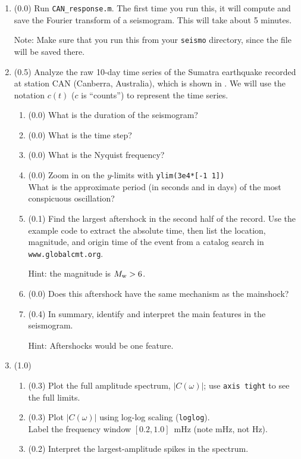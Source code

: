 \documentclass[11pt,titlepage,fleqn]{article}
\begin{document}
\begin{enumerate}

\item (0.0) Run \verb+CAN_response.m+. The first time you run this, it will compute and save the Fourier transform of a seismogram. This will take about 5 minutes.

Note: Make sure that you run this from your \verb+seismo+ directory, since the file will be saved there.


\item (0.5) Analyze the raw 10-day time series of the Sumatra earthquake recorded at station CAN (Canberra, Australia), which is shown in . We will use the notation $c(t)$ ($c$ is ``counts'') to represent the time series.

\begin{enumerate}
\item (0.0) What is the duration of the seismogram?
\item (0.0) What is the time step?
\item (0.0) What is the Nyquist frequency?
\item (0.0) Zoom in on the $y$-limits with \verb+ylim(3e4*[-1 1])+ \\
What is the approximate period (in seconds and in days) of the most conspicuous oscillation?
\item (0.1) Find the largest aftershock in the second half of the record. Use the example code to extract the absolute time, then list the location, magnitude, and origin time of the event from a catalog search in \verb+www.globalcmt.org+.

Hint: the magnitude is $M_{\rm w} > 6$.

\item (0.0) Does this aftershock have the same mechanism as the mainshock?
\item (0.4) In summary, identify and interpret the main features in the seismogram.

Hint: Aftershocks would be one feature.
\end{enumerate}


\item (1.0)
\begin{enumerate}
\item (0.3) Plot the full amplitude spectrum, $|C(\omega)|$; use \verb+axis tight+ to see the full limits.
\item (0.3) Plot $|C(\omega)|$ using log-log scaling (\verb+loglog+). \\
Label the frequency window $[0.2,1.0]$~mHz (note mHz, not Hz).
\item (0.2) Interpret the largest-amplitude spikes in the spectrum.


\end{enumerate}
\end{enumerate}
\end{document}
